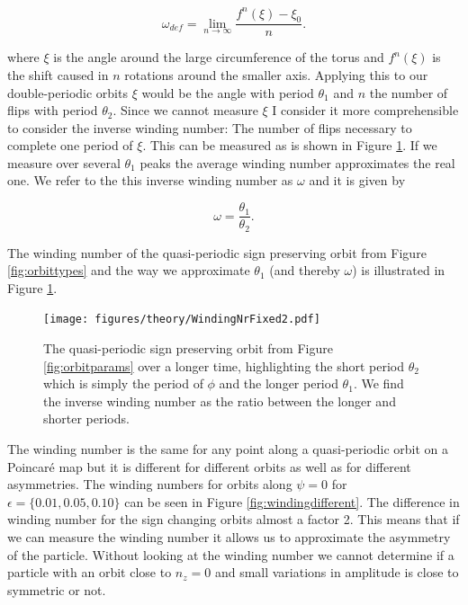 \begin{equation}
\omega_{def}  = \lim\limits_{n \rightarrow \infty} \frac{f^n(\xi) - \xi_0}{n}.
\end{equation}

where $\xi$ is the angle around the large circumference of the torus and $f^n(\xi)$ is the shift caused in $n$ rotations around the smaller axis. 
Applying this to our double-periodic orbits $\xi$ would be the angle with period $\theta_1$ and $n$ the number of flips with period $\theta_2$. 
Since we cannot measure $\xi$ I consider it more comprehensible to consider the inverse winding number: The number of flips necessary to 
complete one period of $\xi$. This can be measured as is shown in Figure \ref{fig:windingDef}. If we measure over several $\theta_1$ peaks the average winding number approximates the real one. We refer to the this inverse winding number as $\omega$ and it is given by

\begin{equation}\label{eq:winding}
\omega = \frac{\theta_1}{\theta_2}.
\end{equation}

\noindent The winding number of the quasi-periodic sign preserving orbit from Figure \ref{fig:orbittypes} and the way we approximate $\theta_1$ (and thereby $\omega$) is illustrated in Figure \ref{fig:windingDef}.

\begin{figure}[H]
\begin{center}
\texttt{[image: figures/theory/WindingNrFixed2.pdf]}
\end{center}
\caption{The quasi-periodic sign preserving orbit from Figure \ref{fig:orbitparams} over a longer time, highlighting the short period $\theta_2$ which is simply the period of $\phi$ and the longer period $\theta_1$. We find the inverse winding number as the ratio between the longer and shorter periods.}
\label{fig:windingDef}
\end{figure}

The winding number is the same for any point along a quasi-periodic orbit on a Poincaré map but it is different for different orbits as well as for different asymmetries. The winding numbers for orbits along $\psi=0$ for $\epsilon=\{0.01, 0.05, 0.10\}$ can be seen in Figure \ref{fig:windingdifferent}. The difference in winding number for the sign changing orbits almost a factor 2. This means that if we can measure the winding number it allows us to approximate the asymmetry of the particle. Without looking at the winding number we cannot determine if a particle with an orbit close to $n_z = 0$ and small variations in amplitude is close to symmetric or not.
 
